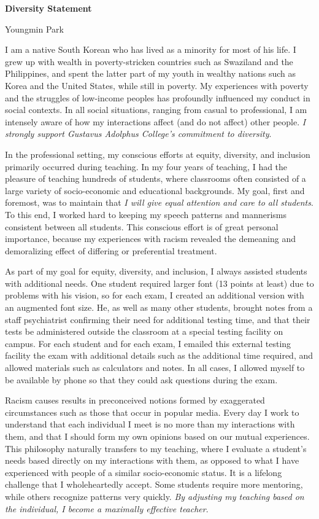 \documentclass[a4paper,11pt]{article}
\begin{document}
\begin{center}
\Large \textbf{Diversity Statement}

\Large Youngmin Park
\end{center}

I am a native South Korean who has lived as a minority for most of his life. I grew up with wealth in poverty-stricken countries such as Swaziland and the Philippines, and spent the latter part of my youth in wealthy nations such as Korea and the United States, while still in poverty. My experiences with poverty and the struggles of low-income peoples has profoundly influenced my conduct in social contexts. In all social situations, ranging from casual to professional, I am intensely aware of how my interactions affect (and do not affect) other people. \textit{I strongly support Gustavus Adolphus College's commitment to diversity}.

In the professional setting, my conscious efforts at equity, diversity, and inclusion primarily occurred during teaching. In my four years of teaching, I had the pleasure of teaching hundreds of students, where classrooms often consisted of a large variety of socio-economic and educational backgrounds. My goal, first and foremost, was to maintain that \textit{I will give equal attention and care to all students}. To this end, I worked hard to keeping my speech patterns and mannerisms consistent between all students. This conscious effort is of great personal importance, because my experiences with racism revealed the demeaning and demoralizing effect of differing or preferential treatment.

As part of my goal for equity, diversity, and inclusion, I always assisted students with additional needs. One student required larger font (13 points at least) due to problems with his vision, so for each exam, I created an additional version with an augmented font size. He, as well as many other students, brought notes from a staff psychiatrist confirming their need for additional testing time, and that their tests be administered outside the classroom at a special testing facility on campus. For each student and for each exam, I emailed this external testing facility the exam with additional details such as the additional time required, and allowed materials such as calculators and notes. In all cases, I allowed myself to be available by phone so that they could ask questions during the exam.

Racism causes results in preconceived notions formed by exaggerated circumstances such as those that occur in popular media. Every day I work to understand that each individual I meet is no more than my interactions with them, and that I should form my own opinions based on our mutual experiences. This philosophy naturally transfers to my teaching, where I evaluate a student's needs based directly on my interactions with them, as opposed to what I have experienced with people of a similar socio-economic status. It is a lifelong challenge that I wholeheartedly accept. Some students require more mentoring, while others recognize patterns very quickly. \textit{By adjusting my teaching based on the individual, I become a maximally effective teacher}.
\end{document}
